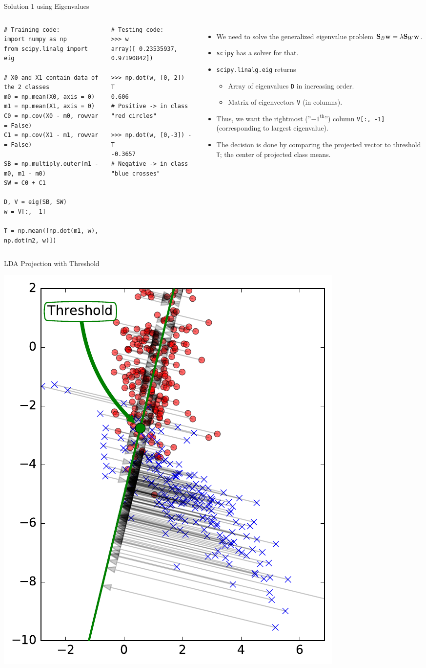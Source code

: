 \documentclass[10pt, aspectratio=169]{beamer} %
\newcommand{\w}{{\bf w}}
\newcommand{\SB}{{\bf S}}
\begin{document}
\begin{frame}[fragile,allowframebreaks=0.8]
 {Solution 1 using Eigenvalues}
\begin{columns}[onlytextwidth]
\begin{lstlisting}
# Training code:
import numpy as np
from scipy.linalg import eig

# X0 and X1 contain data of the 2 classes
m0 = np.mean(X0, axis = 0)
m1 = np.mean(X1, axis = 0)
C0 = np.cov(X0 - m0, rowvar = False)
C1 = np.cov(X1 - m1, rowvar = False)

SB = np.multiply.outer(m1 - m0, m1 - m0)
SW = C0 + C1

D, V = eig(SB, SW)
w = V[:, -1]

T = np.mean([np.dot(m1, w), np.dot(m2, w)])
\end{lstlisting}
\begin{lstlisting}
# Testing code:
>>> w
array([ 0.23535937,  0.97190842])

>>> np.dot(w, [0,-2]) - T
0.606
# Positive -> in class "red circles"

>>> np.dot(w, [0,-3]) - T
-0.3657
# Negative -> in class "blue crosses"
\end{lstlisting}
\begin{itemize}
\item We need to solve the generalized eigenvalue problem
$\SB_B\w = \lambda \SB_W\w$.
\item \verb+scipy+ has a solver for that.
\item \verb+scipy.linalg.eig+ returns
\begin{itemize}
\item Array of eigenvalues \verb+D+ in increasing order.
\item Matrix of eigenvectors \verb+V+ (in columns).
\end{itemize}
\item Thus, we want the rightmost (''$-1^{\text{th}}$'') column \verb+V[:, -1]+ (corresponding to largest eigenvalue).
\item The decision is done by comparing the projected vector to threshold \verb+T+; the center of projected class means.
\end{itemize}
\end{columns}
\end{frame}

\begin{frame}{LDA Projection with Threshold}
\centerline{\includegraphics[width=0.4\columnwidth]{LDA_proj1_threshold.pdf}}
\end{frame}
\end{document}
